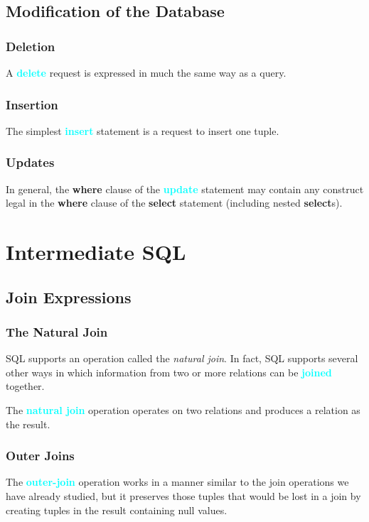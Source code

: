 \documentclass[a4paper,12pt,twoside,openany]{book}
\newcommand{\textcy}[1]{\textbf{\textcolor{cyan}{#1}}}
\begin{document}
\section{Modification of the Database}
\subsection{Deletion}

A \textcy{delete} request is expressed in much the same way as a query.

\subsection{Insertion}

The simplest \textcy{insert} statement is a request to insert one tuple.

\subsection{Updates}

In general, the \textbf{where} clause of the \textcy{update} statement may contain any construct legal in the \textbf{where} clause of the \textbf{select} statement (including nested \textbf{select}s).

\chapter{Intermediate SQL}
\section{Join Expressions}
\subsection{The Natural Join}

SQL supports an operation called the \textit{natural join}. In fact, SQL supports several other ways in which information from two or more relations can be \textcy{joined} together.

The \textcy{natural join} operation operates on two relations and produces a relation as the result.

\subsection{Outer Joins}

The \textcy{outer-join} operation works in a manner similar to the join operations we have already studied, but it preserves those tuples that would be lost in a join by creating tuples in the result containing null values.
\end{document}
